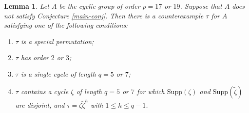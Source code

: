 \documentclass[letterpaper,12pt]{amsart}
\numberwithin{equation}{section}
\numberwithin{algorithm}{section}
\newtheorem{lemma}{Lemma}[section]
\theoremstyle{definition}
\newcommand{\tzeta}{\tilde{\zeta}}
\newcommand{\Supp}{\mathrm{Supp}}
\begin{document}
\begin{lemma} \label{ad hoc}
Let $A$ be the cyclic group of order $p=17$ or $19$. Suppose that $A$ does not satisfy Conjecture \ref{main-conj}. Then there is a counterexample $\tau$ for $A$ satisfying one of the following conditions:
\begin{enumerate}
	\item[(i)] $\tau$ is a special permutation;
	\item[(ii)] $\tau$ has order $2$ or $3$;
	\item[(iii)] $\tau$ is a single cycle of length $q=5$ or $7$;
	\item[(iv)] $\tau$ contains a cycle $\zeta$ of length $q=5$ or $7$ for which $\Supp(\zeta)$ and $\Supp(\tzeta)$ are disjoint, and $\tau = \zeta \tzeta^h$ with $1 \leq h \leq q-1$. 
\end{enumerate}
\end{lemma}
\end{document}

